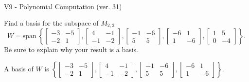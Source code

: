 \begin{exercise}
  \begin{exerciseTitle}V9 - Polynomial Computation (ver. 31)\end{exerciseTitle}
  \begin{exerciseStatement}
    Find a basis for the subspace of \(M_{2,2}\) 
\[W=\mathrm{span}\ \left\{\left[\begin{array}{cc}
-3 & -5 \\
-2 & 1
\end{array}\right] , \left[\begin{array}{cc}
4 & -1 \\
-1 & -2
\end{array}\right] , \left[\begin{array}{cc}
-1 & -6 \\
5 & 5
\end{array}\right] , \left[\begin{array}{cc}
-6 & 1 \\
1 & -6
\end{array}\right] , \left[\begin{array}{cc}
1 & 5 \\
0 & -4
\end{array}\right]\right\}.\]
 Be sure to explain why your result is a basis.


  \end{exerciseStatement}
  \begin{exerciseAnswer}
   A basis of \(W\) is  \(\left\{\left[\begin{array}{cc}
-3 & -5 \\
-2 & 1
\end{array}\right] , \left[\begin{array}{cc}
4 & -1 \\
-1 & -2
\end{array}\right] , \left[\begin{array}{cc}
-1 & -6 \\
5 & 5
\end{array}\right] , \left[\begin{array}{cc}
-6 & 1 \\
1 & -6
\end{array}\right]\right\}\).
  


  \end{exerciseAnswer}
\end{exercise}